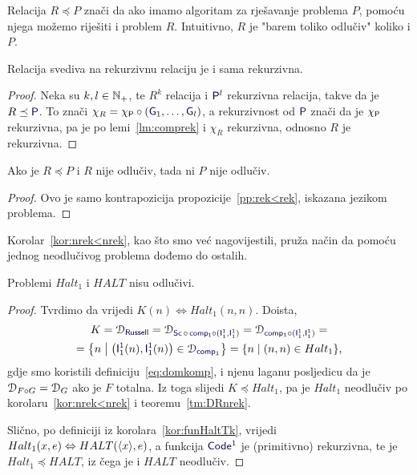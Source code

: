 Relacija $R\preceq P$ znači da ako imamo algoritam za rješavanje problema $P$, pomoću njega možemo riješiti i problem $R$. Intuitivno, $R$ je "barem toliko odlučiv" koliko i $P$.

\begin{propozicija}[{name=[svedivost čuva rekurzivnost]}]\label{pp:rek<rek}
Relacija svediva na rekurzivnu relaciju je i sama rekurzivna.
\end{propozicija}
\begin{proof}
Neka su $k,l\in{\mathbb N}_+$, te $R^k$ relacija i $\f P^l$ rekurzivna relacija, takve da je $R\preceq\f P$. To znači $\chi_R=\chi_{\f P}\circ(\f G_1,\dotsc,\f G_l)$, a rekurzivnost od $\f P$ znači da je $\chi_{\f P}$ rekurzivna, pa je po lemi~\ref{lm:comprek} i $\chi_R$ rekurzivna, odnosno $R$ je rekurzivna.
\end{proof}

\begin{korolar}[{name=[inverz svedivosti čuva neodlučivost]}]\label{kor:nrek<nrek}
Ako je $R\preceq P$ i $R$ nije odlučiv, tada ni $P$ nije odlučiv.
\end{korolar}
\begin{proof}
Ovo je samo kontrapozicija propozicije~\ref{pp:rek<rek}, iskazana jezikom problema.
\end{proof}


Korolar~\ref{kor:nrek<nrek}, kao što smo već nagovijestili, pruža način da pomoću jednog neodlučivog problema dođemo do ostalih.

\begin{propozicija}[{name=[neodlučivost problema zaustavljanja za RAM-strojeve]}]\label{pp:Haltnodl}
Problemi $Halt_1$ i $HALT$ nisu odlučivi.
\end{propozicija}
\begin{proof}
Tvrdimo da vrijedi $K(n)\Leftrightarrow Halt_1(n,n)$. Doista,
\begin{multline}
    K=\dom{\f{Russell}}=\dom{\f{Sc}\,\circ\,\f{comp_1}\circ(\f I_1^1,\f I_1^1)}=\dom{\f{comp}_1\circ(\f I_1^1,\f I_1^1)}=\\
    =\left\{n\;\middle\vert\;\bigl(\f I_1^1(n),\f I_1^1(n)\bigr)\in\dom{\f{comp}_1}\right\}
    =\{n\mid(n,n)\in Halt_1\}\text,
\end{multline}
gdje smo koristili definiciju~\eqref{eq:domkomp}, i njenu laganu posljedicu da je $\mathcal D_{F\circ G}=\mathcal D_{G}$ ako je $F$ totalna. Iz toga slijedi $K\preceq Halt_1$, pa je $Halt_1$ neodlučiv po korolaru~\ref{kor:nrek<nrek} i teoremu~\ref{tm:DRnrek}.

Slično, po definiciji iz korolara~\ref{kor:funHaltTk}, vrijedi $Halt_1(x,e)\Leftrightarrow HALT(\langle x\rangle,e)$, a funkcija $\f{Code}^1$ je (primitivno) rekurzivna, te je $Halt_1\!\preceq HALT$, iz čega je i $HALT$ neodlučiv.
\end{proof}

